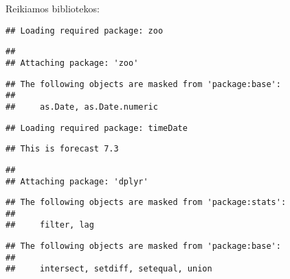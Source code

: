 \begin{frame}[fragile]

Reikiamos bibliotekos:

\begin{Shaded}
\begin{Highlighting}[]
\NormalTok{(}\NormalTok{)}
\end{Highlighting}
\end{Shaded}

\begin{verbatim}
## Loading required package: zoo
\end{verbatim}

\begin{verbatim}
## 
## Attaching package: 'zoo'
\end{verbatim}

\begin{verbatim}
## The following objects are masked from 'package:base':
## 
##     as.Date, as.Date.numeric
\end{verbatim}

\begin{verbatim}
## Loading required package: timeDate
\end{verbatim}

\begin{verbatim}
## This is forecast 7.3
\end{verbatim}

\begin{Shaded}
\begin{Highlighting}[]
\NormalTok{(}\NormalTok{)}
\end{Highlighting}
\end{Shaded}

\begin{verbatim}
## 
## Attaching package: 'dplyr'
\end{verbatim}

\begin{verbatim}
## The following objects are masked from 'package:stats':
## 
##     filter, lag
\end{verbatim}

\begin{verbatim}
## The following objects are masked from 'package:base':
## 
##     intersect, setdiff, setequal, union
\end{verbatim}

\begin{Shaded}
\begin{Highlighting}[]
\NormalTok{(}\NormalTok{)}
\end{Highlighting}
\end{Shaded}


\end{frame}
